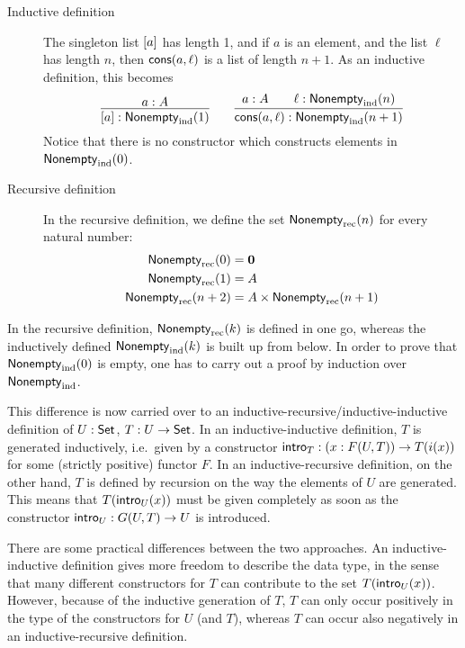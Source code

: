 \documentclass{article}
\begin{document}
\begin{description}
\item[Inductive definition] The singleton list $[a]$ has length 1, and if $a$ is
  an element, and the list $\ell$ has length $n$, then
  $\mathsf{cons}(a, \ell)$ is a list of length $n + 1$. As an inductive
  definition, this becomes
\[
\infer{\singleVec{a} : \Vecind(1)}{a : A} \qquad \infer{\consVec{a}{\ell} :
  \Vecind(n + 1)}{a : A & \quad \ell : \Vecind(n)}
\]
Notice that there is no constructor which constructs elements in
$\mathsf{Nonempty}_{\text{ind}}(0)$.

\item[Recursive definition] In the recursive definition, we define the
  set $\mathsf{Nonempty}_{\text{rec}}(n)$ for every natural number:
  \begin{align*}
    \mathsf{Nonempty}_{\text{rec}}(0) &= \mathbf{0} \\
    \mathsf{Nonempty}_{\text{rec}}(1) &= A \\
    \mathsf{Nonempty}_{\text{rec}}(n + 2) &= A \times \mathsf{Nonempty}_{\text{rec}}(n + 1)
  \end{align*}

\end{description}

In the recursive definition, $\mathsf{Nonempty}_{\text{rec}}(k)$ is defined in one go,
whereas the inductively defined $\mathsf{Nonempty}_{\text{ind}}(k)$ is built up from
below. In order to prove that $\mathsf{Nonempty}_{\text{ind}}(0)$ is empty, one has to carry
out a proof by induction over $\mathsf{Nonempty}_{\text{ind}}$.

This difference is now carried over to an
inductive-recursive/inductive-inductive definition of $U : \mathsf{Set}$, $T :
U \to \mathsf{Set}$.
In an inductive-inductive definition, $T$ is generated
inductively, i.e.\ given by a constructor $\mathsf{intro}_{T} : (x : F(U, T))
\to T(i(x))$ for some (strictly positive) functor
$F$. %
In an inductive-recursive definition, on the other hand, $T$ is
defined by recursion on the way the elements of $U$ are
generated. This means that $T(\mathsf{intro}_{U}(x))$ must be given completely
as soon as the constructor $\mathsf{intro}_{U} : G(U, T) \to U$ is introduced.


There are some practical differences between the two approaches. An
inductive-inductive definition gives more freedom to describe the data
type, in the sense that many different constructors for $T$ can
contribute to the set $T(\mathsf{intro}_{U}(x))$.  However, because of the
inductive generation of $T$, $T$ can only occur positively in the type
of the constructors for $U$ (and $T$), whereas $T$ can occur also
negatively in an inductive-recursive definition.
\end{document}
